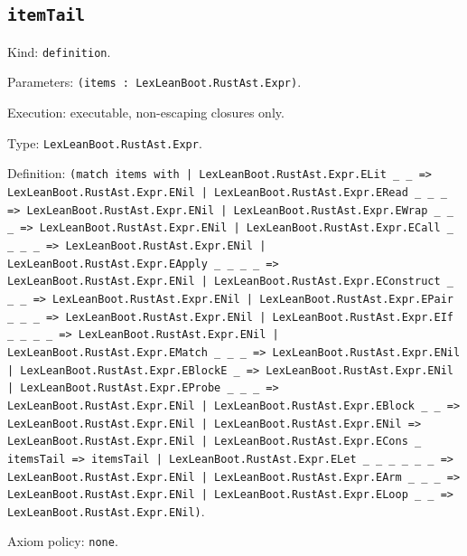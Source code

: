 \documentclass[11pt]{article}
\begin{document}
\subsection*{\texttt{itemTail}}
\noindent Kind: \texttt{definition}.\par
\noindent Parameters: \texttt{(items : LexLeanBoot.RustAst.Expr)}.\par
\noindent Execution: executable, non-escaping closures only.\par
\noindent Type: \texttt{LexLeanBoot.RustAst.Expr}.\par
\noindent Definition: \texttt{(match items with | LexLeanBoot.RustAst.Expr.ELit \_ \_ => LexLeanBoot.RustAst.Expr.ENil | LexLeanBoot.RustAst.Expr.ERead \_ \_ \_ => LexLeanBoot.RustAst.Expr.ENil | LexLeanBoot.RustAst.Expr.EWrap \_ \_ \_ => LexLeanBoot.RustAst.Expr.ENil | LexLeanBoot.RustAst.Expr.ECall \_ \_ \_ \_ => LexLeanBoot.RustAst.Expr.ENil | LexLeanBoot.RustAst.Expr.EApply \_ \_ \_ \_ => LexLeanBoot.RustAst.Expr.ENil | LexLeanBoot.RustAst.Expr.EConstruct \_ \_ \_ => LexLeanBoot.RustAst.Expr.ENil | LexLeanBoot.RustAst.Expr.EPair \_ \_ \_ => LexLeanBoot.RustAst.Expr.ENil | LexLeanBoot.RustAst.Expr.EIf \_ \_ \_ \_ => LexLeanBoot.RustAst.Expr.ENil | LexLeanBoot.RustAst.Expr.EMatch \_ \_ \_ => LexLeanBoot.RustAst.Expr.ENil | LexLeanBoot.RustAst.Expr.EBlockE \_ => LexLeanBoot.RustAst.Expr.ENil | LexLeanBoot.RustAst.Expr.EProbe \_ \_ \_ => LexLeanBoot.RustAst.Expr.ENil | LexLeanBoot.RustAst.Expr.EBlock \_ \_ => LexLeanBoot.RustAst.Expr.ENil | LexLeanBoot.RustAst.Expr.ENil => LexLeanBoot.RustAst.Expr.ENil | LexLeanBoot.RustAst.Expr.ECons \_ itemsTail => itemsTail | LexLeanBoot.RustAst.Expr.ELet \_ \_ \_ \_ \_ \_ => LexLeanBoot.RustAst.Expr.ENil | LexLeanBoot.RustAst.Expr.EArm \_ \_ \_ => LexLeanBoot.RustAst.Expr.ENil | LexLeanBoot.RustAst.Expr.ELoop \_ \_ => LexLeanBoot.RustAst.Expr.ENil)}.\par
\noindent Axiom policy: \texttt{none}.\par
\end{document}
